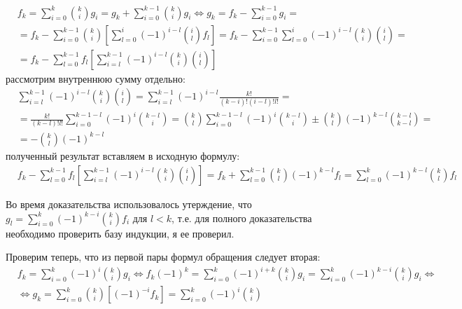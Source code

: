 \documentclass[a4paper,12pt]{article}
\begin{document}
\begin{Solution}
\[
	\begin{split}
		& f_k = \sum_{i=0}^k \binom{k}{i}g_i = g_k + \sum_{i=0}^{k-1} \binom{k}{i}g_i \Leftrightarrow g_k = f_k - \sum_{i=0}^{k-1}g_i = \\
		& = f_k - \sum_{i=0}^{k-1} \binom{k}{i} \left[\sum_{l=0}^i {\left(-1\right)}^{i-l} \binom{i}{l} f_l \right] = f_k - \sum_{i=0}^{k-1}\sum_{l=0}^i {\left(-1\right)}^{i-l} \binom{k}{i}\binom{i}{l} = \\
		& = f_k - \sum_{l=0}^{k-1}f_l \left[\sum_{i=l}^{k-1} {\left(-1\right)}^{i-l} \binom{k}{i} \binom{i}{l}\right]
	\end{split}
\]
рассмотрим внутреннюю сумму отдельно:
\[
	\begin{split}
		& \sum_{i=l}^{k-1} {\left(-1\right)}^{i-l} \binom{k}{i} \binom{i}{l} = \sum_{i=l}^{k-1} {\left(-1\right)}^{i-l} \frac{k!}{\left(k-i\right)!\left(i-l\right)!l!} = \\
		& = \frac{k!}{\left(k-l\right)!l!} \sum_{i=0}^{k-1-l} {\left(-1\right)}^{i} \binom{k-l}{i} = \binom{k}{l}\sum_{i=0}^{k-1-l} {\left(-1\right)}^i \binom{k-l}{i} \pm \binom{k}{l}{\left(-1\right)}^{k-l} \binom{k-l}{k-l} = \\
		& = -\binom{k}{l}{\left(-1\right)}^{k-l}
	\end{split}
\]
полученный результат вставляем в исходную формулу:
\[
	\begin{split}
		& f_k - \sum_{l=0}^{k-1}f_l \left[\sum_{i=l}^{k-1} {\left(-1\right)}^{i-l} \binom{k}{i} \binom{i}{l} \right] = f_k + \sum_{l=0}^{k-1} \binom{k}{l} {\left(-1\right)}^{k-l} f_l = \sum_{l=0}^{k} {\left(-1\right)}^{k-l} \binom{k}{l} f_l
	\end{split}
\]

Во время доказательства использовалось утерждение, что $g_l = \sum_{i=0}^k {\left(-1\right)}^{k-i} \binom{k}{i} f_i$ для $l<k$, т.е. для полного доказательства необходимо проверить базу индукции, я ее проверил.

Проверим теперь, что из первой пары формул обращения следует вторая:
\[
\begin{split}
	& f_k = \sum_{i=0}^{k} {\left(-1\right)}^{i} \binom{k}{i} g_i \Leftrightarrow f_k {\left(-1\right)}^{k} = \sum_{i=0}^{k} {\left(-1\right)}^{i+k} \binom{k}{i} g_i = \sum_{i=0}^{k} {\left(-1\right)}^{k-i} \binom{k}{i} g_i \Leftrightarrow \\
	& \Leftrightarrow g_k = \sum_{i=0}^k \binom{k}{i} \left[{\left(-1\right)}^{-i} f_k\right] = \sum_{i=0}^{k} {\left(-1\right)}^{i} \binom{k}{i}
\end{split}
\]
\end{Solution}
\end{document}
